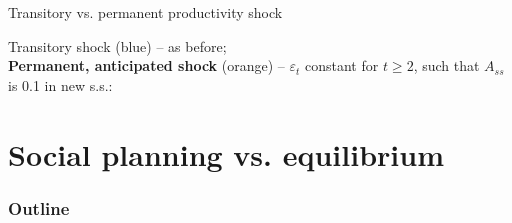 \documentclass{beamer}
\begin{document}
\begin{frame}{Transitory vs. permanent productivity shock}

  Transitory shock (blue) -- as before; \\ \textbf{Permanent, anticipated shock} (orange) -- $\varepsilon_t$ constant for $t \geq 2$, such that $A_{ss}$ is 0.1 in new s.s.:
\begin{center}
\vspace{-5mm}
\begin{figure}[h!]
\end{figure}
\end{center}
%
\end{frame}

\section{Social planning vs. equilibrium}

\begin{frame}
\frametitle{Outline}
\tableofcontents[currentsection]
\end{frame}
\end{document}
